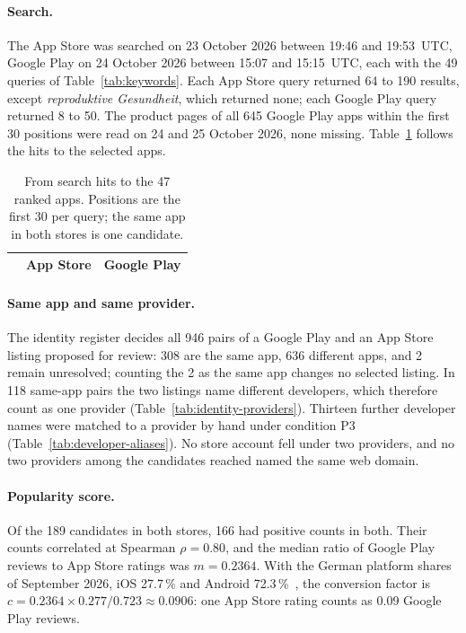\paragraph{Search.} The App Store was searched on 23 October 2026 between 19:46 and 19:53~UTC,
Google Play on 24 October 2026 between 15:07 and 15:15~UTC, each with the 49 queries of
Table~\ref{tab:keywords}. Each App Store query returned 64 to 190 results, except
\emph{reproduktive Gesundheit}, which returned none; each Google Play query returned 8 to 50. The
product pages of all 645 Google Play apps within the first 30 positions were read on 24 and 25
October 2026, none missing. Table~\ref{tab:sample-flow} follows the hits to the selected apps.

\begin{table}[H]
\centering
\begin{singlespace}
\caption[From search hits to the 47 ranked apps]{From search hits to the 47 ranked apps. Positions
are the first 30 per query; the same app in both stores is one candidate.}
\label{tab:sample-flow}
\small
\begin{tabular}{@{}lrr@{}}
\toprule
 & \textbf{App Store} & \textbf{Google Play} \\
\midrule
\end{tabular}
\end{singlespace}
\end{table}

\paragraph{Same app and same provider.} The identity register decides all 946 pairs of a Google
Play and an App Store listing proposed for review: 308 are the same app, 636 different apps, and 2
remain unresolved; counting the 2 as the same app changes no selected listing. In 118 same-app
pairs the two listings name different developers, which therefore count as one provider
(Table~\ref{tab:identity-providers}). Thirteen further developer names were matched to a provider
by hand under condition P3 (Table~\ref{tab:developer-aliases}). No store account fell under two
providers, and no two providers among the candidates reached named the same web domain.

\paragraph{Popularity score.} Of the 189 candidates in both stores, 166 had positive counts in
both. Their counts correlated at Spearman $\rho = 0.80$, and the median ratio of Google Play
reviews to App Store ratings was $m = 0.2364$. With the German platform shares of September 2026,
iOS 27.7\,\% and Android 72.3\,\%~\parencite{statcounter2026os}, the conversion factor is
$c = 0.2364 \times 0.277 / 0.723 \approx 0.0906$: one App Store rating counts as 0.09 Google Play
reviews.

